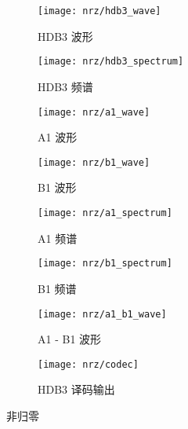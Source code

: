 \documentclass[../main]{subfiles}
\begin{document}
\begin{figure}[htbp]
  \centering
  \begin{subfigure}[htbp]{0.45\linewidth}
    \centering
    \texttt{[image: nrz/hdb3\_wave]}
    \caption{HDB3 波形}%
    \label{fig:nrz/hdb3_wave}
  \end{subfigure}
  \quad
  \begin{subfigure}[htbp]{0.45\linewidth}
    \centering
    \texttt{[image: nrz/hdb3\_spectrum]}
    \caption{HDB3 频谱}%
    \label{fig:nrz/hdb3_spectrum}
  \end{subfigure}

  \begin{subfigure}[htbp]{0.45\linewidth}
    \centering
    \texttt{[image: nrz/a1\_wave]}
    \caption{A1 波形}%
    \label{fig:nrz/a1_wave}
  \end{subfigure}
  \quad
  \begin{subfigure}[htbp]{0.45\linewidth}
    \centering
    \texttt{[image: nrz/b1\_wave]}
    \caption{B1 波形}%
    \label{fig:nrz/b1_wave}
  \end{subfigure}

  \begin{subfigure}[htbp]{0.45\linewidth}
    \centering
    \texttt{[image: nrz/a1\_spectrum]}
    \caption{A1 频谱}%
    \label{fig:nrz/a1_spectrum}
  \end{subfigure}
  \quad
  \begin{subfigure}[htbp]{0.45\linewidth}
    \centering
    \texttt{[image: nrz/b1\_spectrum]}
    \caption{B1 频谱}%
    \label{fig:nrz/b1_spectrum}
  \end{subfigure}

  \begin{subfigure}[htbp]{0.45\linewidth}
    \centering
    \texttt{[image: nrz/a1\_b1\_wave]}
    \caption{A1 - B1 波形}%
    \label{fig:nrz/a1_b1_wave}
  \end{subfigure}
  \quad
  \begin{subfigure}[htbp]{0.45\linewidth}
    \centering
    \texttt{[image: nrz/codec]}
    \caption{HDB3 译码输出}%
    \label{fig:nrz/codec}
  \end{subfigure}
  \caption{非归零}%
  \label{fig:nrz}
\end{figure}
\end{document}
